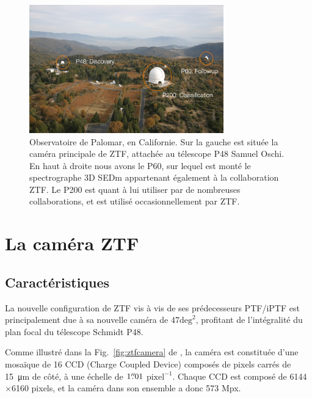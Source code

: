 \documentclass[../main/main.tex]{subfiles}
\begin{document}
\begin{figure}[h]
  \centering
  \includegraphics[width=0.75\textwidth]{../figures/02_ztf/palomar_obs-min.png}
  \caption[Observatoire de Palomar]{Observatoire de Palomar, en Californie. Sur la gauche est
    située la caméra principale de ZTF, attachée au télescope P48 Samuel
    Oschi. En haut à droite nous avons le P60, sur lequel est monté le
    spectrographe 3D SEDm appartenant également à la collaboration
    ZTF. Le P200 est quant à lui utiliser par de nombreuses
    collaborations, et est utilisé occasionnellement par ZTF.}
\label{fig:palomar_obs}
\end{figure}

\section{La caméra ZTF}
\label{sec:ztfcamera}

\subsection{Caractéristiques}

La nouvelle configuration de ZTF vis à vis de ses prédecesseurs PTF/iPTF
est principalement due à sa nouvelle caméra de $47\text{deg}^{2}$, profitant de
l'intégralité du plan focal du télescope Schmidt P48.

Comme illustré dans la Fig.~\ref{fig:ztfcamera} de \citet{BellmZTF2019}, la caméra est
constituée d'une mosaïque de 16 CCD (Charge Coupled Device) composés de
pixels carrés de \SI{15}{\micro\metre} de côté, à une échelle de $1\overset{\prime\prime}{.}01$
$\text{pixel}^{-1}$. Chaque CCD est composé de 6144$\times$6160 pixels,
et la caméra dans son ensemble a donc 573 Mpx. 
\end{document}
